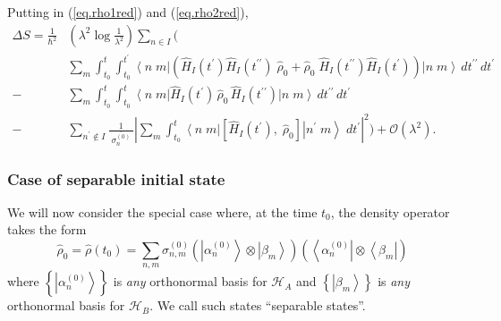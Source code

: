 \documentclass[11pt]{article}
\newcommand{\Od}[1]{\mathcal{O}{\left(#1\right)}}
\newcommand{\bra}[1]{\left\langle#1\right|}
\newcommand{\ket}[1]{\left|#1\right\rangle}
\newcommand{\hilb}{\mathcal{H}}
\newcommand{\op}[1]{\hat{#1}}
\newcommand{\bket}[2]{\ket{#1\;#2}}
\newcommand{\bbra}[2]{\bra{#1\;#2}}
\theoremstyle{theorem}
\theoremstyle{remark}
\theoremstyle{step}
\theoremstyle{gap}
\begin{document}


Putting in (\ref{eq.rho1red}) and (\ref{eq.rho2red}),
\begin{align}\label{eq.entropyresultwithrho2}
\Delta S = \frac{1}{\hbar^2}&\left(\lambda^2 \log\frac{1}{\lambda^2}\right)\sum_{n \in I} \Bigg( \\
& \sum_m\int_{t_0}^t \int_{t_0}^{t^\prime} \bbra{n}{m} \left( \op{H}_I (t^\prime) \op{H}_I(t^{\prime\prime}) \;\op{\rho}_0 + \op{\rho}_0\; \op{H}_I (t^{\prime\prime}) \op{H}_I(t^{\prime}) \right) \bket{n}{m}\,dt^{\prime\prime}\,dt^\prime \nonumber\\
-& \sum_m\int_{t_0}^t \int_{t_0}^{t} \bbra{n}{m}\op{H}_I (t^\prime) \,\op{\rho}_0\, \op{H}_I (t^{\prime\prime})\bket{n}{m}\,dt^{\prime\prime}\,dt^\prime \nonumber\\
-& \sum_{n^\prime \not \in I} \frac{1}{\;\overline{\sigma_n^{(0)}}\;} \left|\sum_m\int_{t_0}^t \bbra{n}{m} \left[\op{H}_I(t^\prime),\; \op{\rho}_0 \right] \bket{n^\prime}{m}\;dt^\prime \right|^2
\Bigg) + \Od{\lambda^2}. \nonumber
\end{align}

\subsubsection{Case of separable initial state}

We will now consider the special case where, at the time \(t_0\), the density operator takes the form
\begin{equation}\label{eq.rho0fullinitial}
\op{\rho}_0 = \op{\rho}\left(t_0\right) = \sum_{n,m} \sigma_{n,m}^{(0)} \left(\ket{\alpha_n^{(0)}}\otimes\ket{\beta_m}\right) \left(\bra{\alpha_n^{(0)}}\otimes\bra{\beta_m}\right)
\end{equation}
where \(\left\{\ket{\alpha_n^{(0)}}\right\}\) is \emph{any} orthonormal basis for \(\hilb_A\) and \(\left\{\ket{\beta_m}\right\}\) is \emph{any} orthonormal basis for \(\hilb_B\). We call such states ``separable states''.
\end{document}
